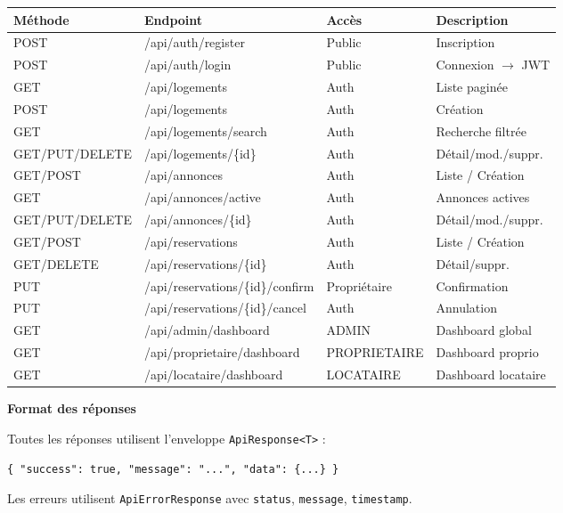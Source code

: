 \documentclass[12pt,a4paper]{article}
\newcommand{\subtitle}[1]{%
    \vspace{0.4em}\noindent%
    \textcolor{primary!80!black}{\bfseries #1}\par\vspace{0.2em}%
}
\begin{document}
\begin{center}
\footnotesize
\begin{tabularx}{\textwidth}{>{\ttfamily}l >{\raggedright\arraybackslash}p{4.8cm} l X}
\toprule
\bfseries Méthode & \bfseries Endpoint & \bfseries Accès & \bfseries Description \\
\midrule
POST & /api/auth/register & Public & Inscription \\
POST & /api/auth/login & Public & Connexion $\to$ JWT \\
GET & /api/logements & Auth & Liste paginée \\
POST & /api/logements & Auth & Création \\
GET & /api/logements/search & Auth & Recherche filtrée \\
GET/PUT/DELETE & /api/logements/\{id\} & Auth & Détail/mod./suppr. \\
GET/POST & /api/annonces & Auth & Liste / Création \\
GET & /api/annonces/active & Auth & Annonces actives \\
GET/PUT/DELETE & /api/annonces/\{id\} & Auth & Détail/mod./suppr. \\
GET/POST & /api/reservations & Auth & Liste / Création \\
GET/DELETE & /api/reservations/\{id\} & Auth & Détail/suppr. \\
PUT & /api/reservations/\{id\}/confirm & Propriétaire & Confirmation \\
PUT & /api/reservations/\{id\}/cancel & Auth & Annulation \\
GET & /api/admin/dashboard & ADMIN & Dashboard global \\
GET & /api/proprietaire/dashboard & PROPRIETAIRE & Dashboard proprio \\
GET & /api/locataire/dashboard & LOCATAIRE & Dashboard locataire \\
\bottomrule
\end{tabularx}
\end{center}

\subtitle{Format des réponses}
Toutes les réponses utilisent l'enveloppe \texttt{ApiResponse<T>} :
\begin{center}
\texttt{\{ "success": true, "message": "...", "data": \{...\} \}}
\end{center}
Les erreurs utilisent \texttt{ApiErrorResponse} avec \texttt{status}, \texttt{message}, \texttt{timestamp}.

\end{document}
